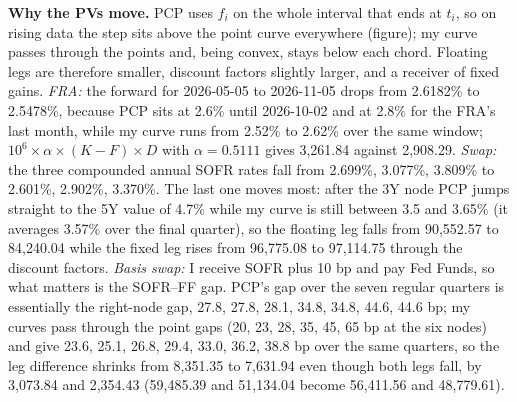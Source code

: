\documentclass[10pt]{article}
\begin{document}
\textbf{Why the PVs move.} PCP uses $f_i$ on the whole interval that ends at $t_i$, so on rising data the step sits above the point
curve everywhere (figure); my curve passes through the points and, being convex, stays below each chord. Floating legs are therefore
smaller, discount factors slightly larger, and a receiver of fixed gains. \emph{FRA:} the forward for 2026-05-05 to 2026-11-05 drops from
2.6182\% to 2.5478\%, because PCP sits at 2.6\% until 2026-10-02 and at 2.8\% for the FRA's last month, while my curve runs from
2.52\% to 2.62\% over the same window; $10^6\times\alpha\times(K-F)\times D$ with $\alpha=0.5111$ gives 3,261.84 against 2,908.29. \emph{Swap:} the three compounded annual
SOFR rates fall from 2.699\%, 3.077\%, 3.809\% to 2.601\%, 2.902\%, 3.370\%. The last one moves most: after the 3Y node PCP jumps
straight to the 5Y value of 4.7\% while my curve is still between 3.5 and 3.65\% (it averages 3.57\% over the final quarter), so the floating
leg falls from 90,552.57 to 84,240.04 while the fixed leg rises from 96,775.08 to 97,114.75 through the discount factors.
\emph{Basis swap:} I receive SOFR plus 10 bp and pay Fed Funds, so what matters is the SOFR--FF gap. PCP's gap over the seven regular
quarters is essentially the right-node gap, 27.8, 27.8, 28.1, 34.8, 34.8, 44.6, 44.6 bp; my curves pass through the point gaps (20, 23, 28, 35, 45, 65 bp at the six nodes) and
give 23.6, 25.1, 26.8, 29.4, 33.0, 36.2, 38.8 bp over the same quarters, so the leg difference shrinks from 8,351.35 to 7,631.94 even though both legs fall, by
3,073.84 and 2,354.43 (59,485.39 and 51,134.04 become 56,411.56 and 48,779.61).
\end{document}
